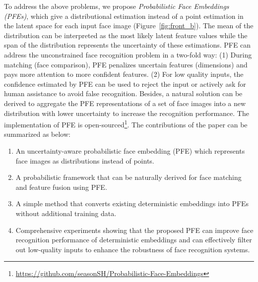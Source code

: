 \documentclass[10pt,twocolumn,letterpaper]{article}
\begin{document}
To address the above problems, we propose \textit{Probabilistic Face Embeddings (PFEs)}, which give a distributional estimation instead of a point estimation in the latent space for each input face image (Figure~\ref{fig:front_b}). The mean of the distribution can be interpreted as the most likely latent feature values while the span of the distribution represents the uncertainty of these estimations. PFE can address the unconstrained face recognition problem in a two-fold way: (1) During matching (face comparison), PFE penalizes uncertain features (dimensions) and pays more attention to more confident features. (2) For low quality inputs, the confidence estimated by PFE can be used to reject the input or actively ask for human assistance to avoid false recognition. Besides, a natural solution can be derived to aggregate the PFE representations of a set of face images into a new distribution with lower uncertainty to increase the recognition performance. The implementation of PFE is open-sourced\footnote{\url{https://github.com/seasonSH/Probabilistic-Face-Embeddings}}. The contributions of the paper can be summarized as below:
\begin{enumerate}[leftmargin=*]\vspace{-0.5em}
    \item An uncertainty-aware probabilistic face embedding (PFE) which represents face images as distributions instead of points.\vspace{-0.5em}
    \item A probabilistic framework that can be naturally derived for face matching and feature fusion using PFE.\vspace{-0.5em}
    \item A simple method that converts existing deterministic embeddings into PFEs without additional training data.\vspace{-0.5em}
    \item Comprehensive experiments showing that the proposed PFE can improve face recognition performance of deterministic embeddings and can effectively filter out low-quality inputs to enhance the robustness of face recognition systems.\vspace{-0.5em}
\end{enumerate}
\end{document}
